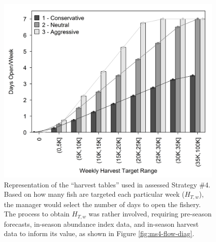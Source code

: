 \documentclass[12pt,]{book}
\theoremstyle{definition}
\theoremstyle{definition}
\theoremstyle{definition}
\theoremstyle{remark}
\begin{document}
\begin{singlespace}
\clearpage

\begin{figure}
  \centering
  \includegraphics{img/Ch3/MS4_Schedules.jpg}
  \caption{Representation of the ``harvest tables'' used in assessed Strategy \#4. Based on how many fish are targeted each particular week ($H_{T,w}$), the manager would select the number of days to open the fishery. The process to obtain $H_{T,w}$ was rather involved, requiring pre-season forecasts, in-season abundance index data, and in-season harvest data to inform its value, as shown in Figure \ref{fig:ms4-flow-diag}.}
  \label{fig:ms4-schedules}
\end{figure}

\clearpage


\end{singlespace}
\end{document}

